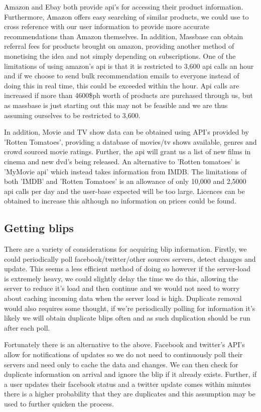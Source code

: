 \documentclass[11pt]{article}
\begin{document}
Amazon and Ebay both provide api's for accessing their product information. Furthermore, Amazon offers easy searching of similar products, we could use to cross reference with our user information to provide more accurate recommendations than Amazon themselves. In addition, Massbase can obtain referral fees for products brought on amazon, providing another method of monetising the idea and not simply depending on subscriptions. One of the limitations of using amazon's api is that it is restricted to 3,600 api calls an hour and if we choose to send bulk recommendation emails to everyone instead of doing this in real time, this could be exceeded within the hour. Api calls are increased if more than 4600\$ph worth of products are purchased through us, but as massbase is just starting out this may not be feasible and we are thus assuming ourselves to be restricted to 3,600.

In addition, Movie and TV show data can be obtained using API's provided by 'Rotten Tomatoes', providing a database of movies/tv shows available, genres and crowd sourced movie ratings. Further, the api will grant us a list of new films in cinema and new dvd's being released. An alternative to 'Rotten tomatoes' is 'MyMovie api' which instead takes information from IMDB. The limitations of both 'IMDB' and 'Rotten Tomatoes' is an allowance of only 10,000 and 2,5000 api calls per day and the user-base expected will be too large. Licences can be obtained to increase this although no information on prices could be found.


\subsection{Getting blips}

There are a variety of considerations for acquiring blip information. Firstly, we could periodically poll facebook/twitter/other sources servers, detect changes and update. This seems a less efficient method of doing so however if the server-load is extremely heavy, we could slightly delay the time we do this, allowing the server to reduce it's load and then continue and we would not need to worry about caching incoming data when the server load is high. Duplicate removal would also requires some thought, if we're periodically polling for information it's likely we will obtain duplicate blips often and as such duplication should be run after each poll.

Fortunately there is an alternative to the above. Facebook and twitter's API's allow for notifications of updates so we do not need to continuously poll their servers and need only to cache the data and changes. We can then check for duplicate information on arrival and ignore the blip if it already exists. Further, if a user updates their facebook status and a twitter update comes within minutes there is a higher probability that they are duplicates and this assumption may be used to further quicken the process.
\end{document}
